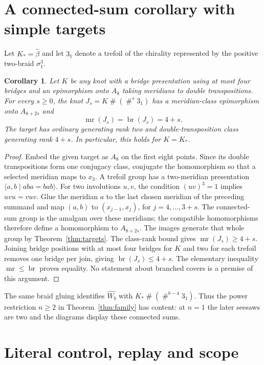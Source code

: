 \documentclass[11pt]{article}
\newtheorem{corollary}[theorem]{Corollary}
\newcommand{\mr}{\operatorname{mr}}
\newcommand{\br}{\operatorname{br}}
\begin{document}
\section{A connected-sum corollary with simple targets}

Let $K_*=\widehat\beta$ and let $3_1$ denote a trefoil of the chirality
represented by the positive two-braid $\sigma_1^3$.

\begin{corollary}\label{cor:sums}
Let $K$ be any knot with a bridge presentation using at most four bridges
and an epimorphism onto $A_8$ taking meridians to double transpositions.
For every $s\ge0$, the knot $J_s=K\mathbin{\#}(\mathbin{\#}^{s}3_1)$
has a meridian-class epimorphism onto $A_{8+2s}$ and
\[
                        \mr(J_s)=\br(J_s)=4+s.
\]
The target has ordinary generating rank two and double-transposition
class generating rank $4+s$. In particular, this holds for $K=K_*$.
\end{corollary}
\begin{proof}
Embed the given target as $A_8$ on the first eight points. Since its
double transpositions form one conjugacy class, conjugate the
homomorphism so that a selected meridian maps to $x_3$.
A trefoil group has a two-meridian presentation
$\langle a,b\mid aba=bab\rangle$. For two involutions $u,v$, the
condition $(uv)^3=1$ implies $uvu=vuv$. Glue the meridian $a$ to the
last chosen meridian of the preceding summand and map
$(a,b)$ to $(x_{j-1},x_j)$, for $j=4,\ldots,3+s$.
The connected-sum group is the amalgam over these meridians; the
compatible homomorphisms therefore define a homomorphism to $A_{8+2s}$.
The images generate that whole group by Theorem~\ref{thm:targets}.
The class-rank bound gives $\mr(J_s)\ge4+s$. Joining bridge positions
with at most four bridges for $K$ and two for each trefoil removes one bridge
per join, giving $\br(J_s)\le4+s$. The elementary inequality
$\mr\le\br$ proves equality. No statement about branched covers is a
premise of this argument.
\end{proof}

The same braid gluing identifies $\widehat{W_b}$ with
$K_*\mathbin{\#}(\mathbin{\#}^{b-4}3_1)$. Thus the power restriction
$n\ge2$ in Theorem~\ref{thm:family} has content: at $n=1$ the later
seesaws are two and the diagrams display these connected sums.

\section{Literal control, replay and scope}\label{sec:literal}
\end{document}
